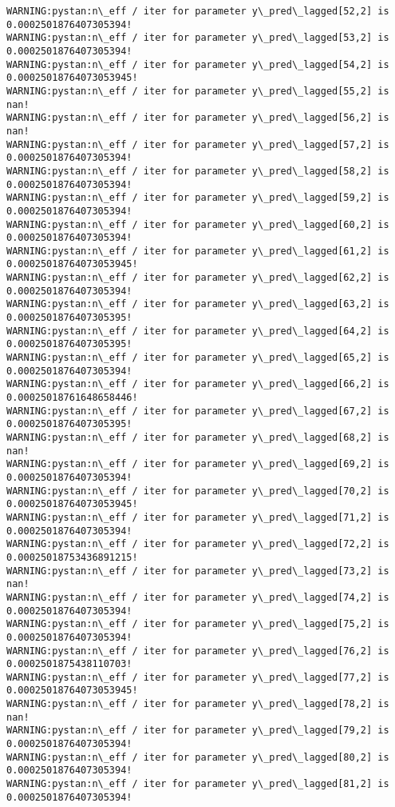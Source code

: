 \documentclass[11pt]{article}
\begin{document}
\begin{Verbatim}[commandchars=\\\{\}]
WARNING:pystan:n\_eff / iter for parameter y\_pred\_lagged[52,2] is 0.0002501876407305394!
WARNING:pystan:n\_eff / iter for parameter y\_pred\_lagged[53,2] is 0.0002501876407305394!
WARNING:pystan:n\_eff / iter for parameter y\_pred\_lagged[54,2] is 0.00025018764073053945!
WARNING:pystan:n\_eff / iter for parameter y\_pred\_lagged[55,2] is nan!
WARNING:pystan:n\_eff / iter for parameter y\_pred\_lagged[56,2] is nan!
WARNING:pystan:n\_eff / iter for parameter y\_pred\_lagged[57,2] is 0.0002501876407305394!
WARNING:pystan:n\_eff / iter for parameter y\_pred\_lagged[58,2] is 0.0002501876407305394!
WARNING:pystan:n\_eff / iter for parameter y\_pred\_lagged[59,2] is 0.0002501876407305394!
WARNING:pystan:n\_eff / iter for parameter y\_pred\_lagged[60,2] is 0.0002501876407305394!
WARNING:pystan:n\_eff / iter for parameter y\_pred\_lagged[61,2] is 0.00025018764073053945!
WARNING:pystan:n\_eff / iter for parameter y\_pred\_lagged[62,2] is 0.0002501876407305394!
WARNING:pystan:n\_eff / iter for parameter y\_pred\_lagged[63,2] is 0.0002501876407305395!
WARNING:pystan:n\_eff / iter for parameter y\_pred\_lagged[64,2] is 0.0002501876407305395!
WARNING:pystan:n\_eff / iter for parameter y\_pred\_lagged[65,2] is 0.0002501876407305394!
WARNING:pystan:n\_eff / iter for parameter y\_pred\_lagged[66,2] is 0.00025018761648658446!
WARNING:pystan:n\_eff / iter for parameter y\_pred\_lagged[67,2] is 0.0002501876407305395!
WARNING:pystan:n\_eff / iter for parameter y\_pred\_lagged[68,2] is nan!
WARNING:pystan:n\_eff / iter for parameter y\_pred\_lagged[69,2] is 0.0002501876407305394!
WARNING:pystan:n\_eff / iter for parameter y\_pred\_lagged[70,2] is 0.00025018764073053945!
WARNING:pystan:n\_eff / iter for parameter y\_pred\_lagged[71,2] is 0.0002501876407305394!
WARNING:pystan:n\_eff / iter for parameter y\_pred\_lagged[72,2] is 0.00025018753436891215!
WARNING:pystan:n\_eff / iter for parameter y\_pred\_lagged[73,2] is nan!
WARNING:pystan:n\_eff / iter for parameter y\_pred\_lagged[74,2] is 0.0002501876407305394!
WARNING:pystan:n\_eff / iter for parameter y\_pred\_lagged[75,2] is 0.0002501876407305394!
WARNING:pystan:n\_eff / iter for parameter y\_pred\_lagged[76,2] is 0.0002501875438110703!
WARNING:pystan:n\_eff / iter for parameter y\_pred\_lagged[77,2] is 0.00025018764073053945!
WARNING:pystan:n\_eff / iter for parameter y\_pred\_lagged[78,2] is nan!
WARNING:pystan:n\_eff / iter for parameter y\_pred\_lagged[79,2] is 0.0002501876407305394!
WARNING:pystan:n\_eff / iter for parameter y\_pred\_lagged[80,2] is 0.0002501876407305394!
WARNING:pystan:n\_eff / iter for parameter y\_pred\_lagged[81,2] is 0.0002501876407305394!

\end{Verbatim}
\end{document}

